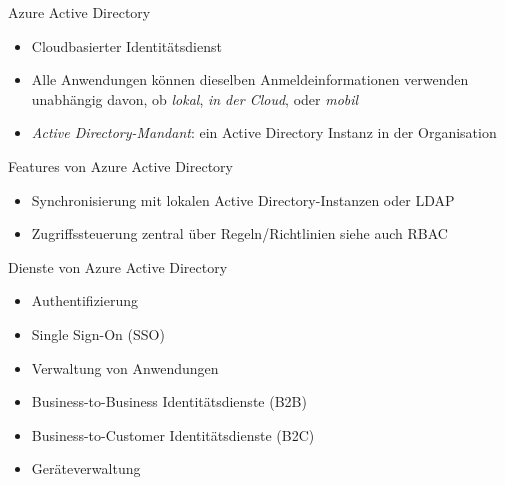 \begin{flashcard}[Definition]{Azure Active Directory}
    \begin{itemize}
        \item Cloudbasierter Identitätsdienst
        \item Alle Anwendungen können dieselben Anmeldeinformationen verwenden\newline
        unabhängig davon, ob \emph{lokal}, \emph{in der Cloud}, oder \emph{mobil}
        \item \emph{Active Directory-Mandant}: ein Active Directory Instanz in der Organisation
    \end{itemize}
\end{flashcard}

\begin{flashcard}[\ ]{Features von Azure Active Directory}
    \begin{itemize}
        \item Synchronisierung mit lokalen Active Directory-Instanzen oder LDAP
        \item Zugriffssteuerung zentral über Regeln/Richtlinien\newline
        siehe auch RBAC
    \end{itemize}
\end{flashcard}

\begin{flashcard}[\ ]{Dienste von Azure Active Directory}
    \begin{itemize}
        \item Authentifizierung
        \item Single Sign-On (SSO)
        \item Verwaltung von Anwendungen
        \item Business-to-Business Identitätsdienste (B2B)
        \item Business-to-Customer Identitätsdienste (B2C)
        \item Geräteverwaltung
    \end{itemize}
\end{flashcard}

